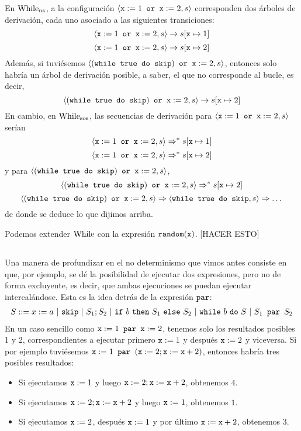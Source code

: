 En $\mathrm{While}_{\mathrm{ns}}$, a la configuración $\langle \texttt{x}:= 1 \texttt{ or } \texttt{x}:=2, s \rangle$ corresponden dos árboles de derivación, cada uno asociado a las siguientes transiciones:
$$\langle \texttt{x}:= 1 \texttt{ or } \texttt{x}:=2, s \rangle \to s[\texttt{x}\mapsto 1]$$
$$\langle \texttt{x}:= 1 \texttt{ or } \texttt{x}:=2, s \rangle \to s[\texttt{x}\mapsto 2]$$
Además, si tuviésemos $\langle (\texttt{while true do skip}) \texttt{ or } \texttt{x}:=2, s \rangle$, entonces solo habría un árbol de derivación posible, a saber, el que no corresponde al bucle, es decir, 
$$\langle (\texttt{while true do skip}) \texttt{ or } \texttt{x}:=2, s \rangle \to s[\texttt{x}\mapsto 2]$$
En cambio, en $\mathrm{While}_{\mathrm{sos}}$, las secuencias de derivación para $\langle \texttt{x}:= 1 \texttt{ or } \texttt{x}:=2, s \rangle$ serían
$$\langle \texttt{x}:= 1 \texttt{ or } \texttt{x}:=2, s \rangle \Rightarrow^* s[\texttt{x}\mapsto 1]$$
$$\langle \texttt{x}:= 1 \texttt{ or } \texttt{x}:=2, s \rangle \Rightarrow^* s[\texttt{x}\mapsto 2]$$
y para $\langle (\texttt{while true do skip}) \texttt{ or } \texttt{x}:=2, s \rangle$, 
$$\langle (\texttt{while true do skip}) \texttt{ or } \texttt{x}:=2, s \rangle \Rightarrow^* s[\texttt{x}\mapsto 2]$$
$$\langle (\texttt{while true do skip}) \texttt{ or } \texttt{x}:=2, s \rangle \Rightarrow \langle \texttt{while true do skip}, s \rangle \Rightarrow\dots$$
de donde se deduce lo que dijimos arriba.

\begin{example}
Podemos extender $\mathrm{While}$ con la expresión $\texttt{random}(\texttt{x})$. [HACER ESTO] 
\end{example}

\subsection{}

Una manera de profundizar en el no determinismo que vimos antes consiste en que, por ejemplo, se dé la posibilidad de ejecutar dos expresiones, pero no de forma excluyente, es decir, que ambas ejecuciones se puedan ejecutar intercalándose. Esta es la idea detrás de la expresión $\texttt{par}$:
\[
    \begin{array}{l}
         S ::= x:=a\ |\ \n{skip}\ |\ S_1;S_2\ |\ \n{if}\ b\ \n{then}\ S_1\ \n{else}\ S_2\ |\ \n{while}\ b\ \n{do}\ S \ | \ S_1 \n{ par } S_2
    \end{array}
\]
En un caso sencillo como $\texttt{x}:= 1 \texttt{ par } \texttt{x}:=2$, tenemos solo los resultados posibles 1 y 2, correspondientes a ejecutar primero $\texttt{x}:= 1$ y después $\texttt{x}:=2$ y viceversa. Si por ejemplo tuviésemos $\texttt{x}:= 1 \texttt{ par } (\texttt{x}:=2; \texttt{x}:=\texttt{x} + 2)$, entonces habría tres posibles resultados:
\begin{itemize}
    \item Si ejecutamos $\texttt{x}:=1$ y luego $\texttt{x}:=2; \texttt{x}:= \texttt{x}+2$, obtenemos $4$.
    \item Si ejecutamos $\texttt{x}:=2; \texttt{x}:= \texttt{x}+2$ y luego $\texttt{x}:=1$, obtenemos $1$.
    \item Si ejecutamos $\texttt{x}:=2$, después $\texttt{x}:=1$ y por último $\texttt{x}:= \texttt{x}+2$, obtenemos 3.
\end{itemize}

